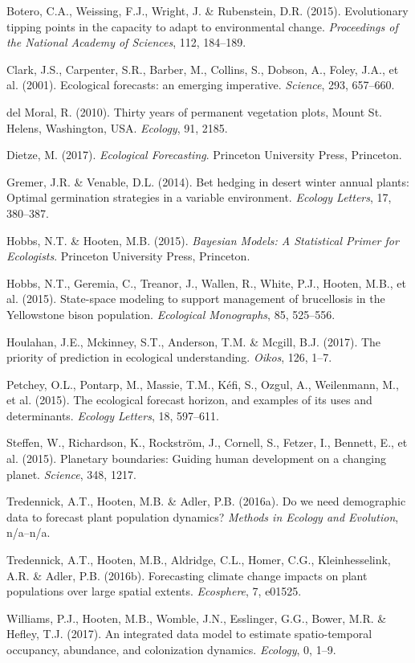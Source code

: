 \documentclass[12pt,]{article}
\begin{document}
\hypertarget{ref-Botero2015}{}
Botero, C.A., Weissing, F.J., Wright, J. \& Rubenstein, D.R. (2015).
Evolutionary tipping points in the capacity to adapt to environmental
change. \emph{Proceedings of the National Academy of Sciences}, 112,
184--189.

\hypertarget{ref-Clark2001}{}
Clark, J.S., Carpenter, S.R., Barber, M., Collins, S., Dobson, A.,
Foley, J.A., et al. (2001). Ecological forecasts: an emerging
imperative. \emph{Science}, 293, 657--660.

\hypertarget{ref-DelMoral2010}{}
{del Moral}, R. (2010). Thirty years of permanent vegetation plots,
Mount St. Helens, Washington, USA. \emph{Ecology}, 91, 2185.

\hypertarget{ref-Dietze2017}{}
Dietze, M. (2017). \emph{Ecological Forecasting}. Princeton University
Press, Princeton.

\hypertarget{ref-Gremer2014}{}
Gremer, J.R. \& Venable, D.L. (2014). Bet hedging in desert winter
annual plants: Optimal germination strategies in a variable environment.
\emph{Ecology Letters}, 17, 380--387.

\hypertarget{ref-Hobbs2015}{}
Hobbs, N.T. \& Hooten, M.B. (2015). \emph{Bayesian Models: A Statistical
Primer for Ecologists}. Princeton University Press, Princeton.

\hypertarget{ref-Hobbs2015EcolMon}{}
Hobbs, N.T., Geremia, C., Treanor, J., Wallen, R., White, P.J., Hooten,
M.B., et al. (2015). State-space modeling to support management of
brucellosis in the Yellowstone bison population. \emph{Ecological
Monographs}, 85, 525--556.

\hypertarget{ref-Houlahan2017}{}
Houlahan, J.E., Mckinney, S.T., Anderson, T.M. \& Mcgill, B.J. (2017).
The priority of prediction in ecological understanding. \emph{Oikos},
126, 1--7.

\hypertarget{ref-Petchey2015}{}
Petchey, O.L., Pontarp, M., Massie, T.M., Kéfi, S., Ozgul, A.,
Weilenmann, M., et al. (2015). The ecological forecast horizon, and
examples of its uses and determinants. \emph{Ecology Letters}, 18,
597--611.

\hypertarget{ref-Steffen2015}{}
Steffen, W., Richardson, K., Rockström, J., Cornell, S., Fetzer, I.,
Bennett, E., et al. (2015). Planetary boundaries: Guiding human
development on a changing planet. \emph{Science}, 348, 1217.

\hypertarget{ref-Tredennick2016MEE}{}
Tredennick, A.T., Hooten, M.B. \& Adler, P.B. (2016a). Do we need
demographic data to forecast plant population dynamics? \emph{Methods in
Ecology and Evolution}, n/a--n/a.

\hypertarget{ref-Tredennick2016Ecos}{}
Tredennick, A.T., Hooten, M.B., Aldridge, C.L., Homer, C.G.,
Kleinhesselink, A.R. \& Adler, P.B. (2016b). Forecasting climate change
impacts on plant populations over large spatial extents.
\emph{Ecosphere}, 7, e01525.

\hypertarget{ref-Williams2017}{}
Williams, P.J., Hooten, M.B., Womble, J.N., Esslinger, G.G., Bower, M.R.
\& Hefley, T.J. (2017). An integrated data model to estimate
spatio-temporal occupancy, abundance, and colonization dynamics.
\emph{Ecology}, 0, 1--9.
\end{document}
